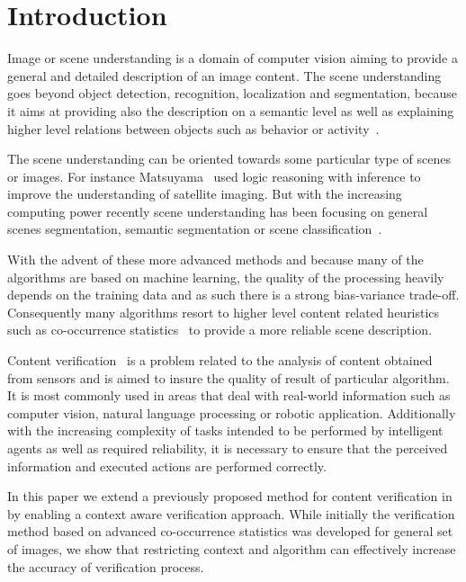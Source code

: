 \documentclass[conference]{IEEEtran}
\begin{document}
\section{Introduction}

Image or scene understanding is a domain of computer vision aiming to provide a general and detailed description of an image content. The scene understanding goes beyond object detection, recognition, localization and segmentation,  because it aims at providing also the description on a semantic level as well as explaining higher level relations between objects such as behavior or activity~\cite{chella:00,luo:05,sagerer:13}.

The scene understanding can be oriented towards some particular type of scenes or images. For instance Matsuyama~\cite{matsuyama:87} used logic reasoning with inference to improve the understanding of satellite imaging. But with the increasing computing power recently scene understanding has been focusing on general scenes segmentation, semantic segmentation or scene classification~\cite{serrano:04,cao:07,siagian:07,zhang:15}.

With the advent of these more advanced methods and because many of the algorithms are based on machine learning, the quality of the processing heavily depends on the training data and as such there is a strong bias-variance trade-off. Consequently many algorithms resort to higher level content related heuristics such as co-occurrence statistics~\cite{ladicky:10,ladicky:13} to provide a more reliable scene description. 

Content verification~\cite{matsuyama:87,palmeri:04} is a problem related to the analysis of content obtained from sensors and is aimed to insure the quality of result of particular algorithm. It is most commonly used in areas that deal with real-world information such as computer vision, natural language processing or robotic application. Additionally with the increasing complexity of tasks intended to be performed by intelligent agents as well as required reliability, it is necessary to ensure that the perceived information and executed actions are performed correctly. 

In this paper we extend a previously proposed method for content verification in~\cite{lukac:13d,lukac:15,lukac:16b} by enabling a context aware verification approach. While initially the verification method based on advanced co-occurrence statistics was developed for general set of images, we show that restricting context and algorithm can effectively increase the accuracy of verification process. 
\end{document}
